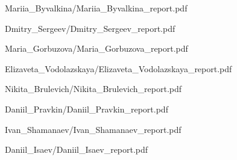 \documentclass[a4paper]{article}
\begin{document}
{Mariia_Byvalkina/Mariia_Byvalkina_report.pdf}

{Dmitry_Sergeev/Dmitry_Sergeev_report.pdf}

{Maria_Gorbuzova/Maria_Gorbuzova_report.pdf}

{Elizaveta_Vodolazskaya/Elizaveta_Vodolazskaya_report.pdf}

{Nikita_Brulevich/Nikita_Brulevich_report.pdf}

{Daniil_Pravkin/Daniil_Pravkin_report.pdf}

{Ivan_Shamanaev/Ivan_Shamanaev_report.pdf}

{Daniil_Isaev/Daniil_Isaev_report.pdf}
\end{document}

